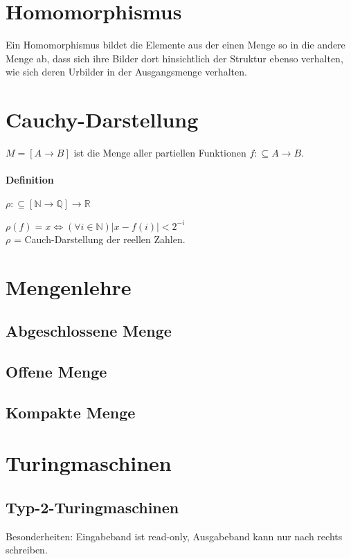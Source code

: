 \documentclass[ngerman]{scrartcl}
\begin{document}
\section{Homomorphismus}
Ein Homomorphismus bildet die Elemente aus der einen Menge so in die andere Menge ab, dass sich ihre Bilder dort hinsichtlich der Struktur ebenso verhalten, wie sich deren Urbilder in der Ausgangsmenge verhalten.


\section{Cauchy-Darstellung}
$ M = [A \rightarrow B] $ ist die Menge aller partiellen Funktionen $ f : \subseteq A \rightarrow B $.

\paragraph{Definition} $ \rho : \subseteq[\mathbb{N}\rightarrow\mathbb{Q}] \rightarrow \mathbb{R}$ 

\begin{center}
  $ \rho(f) = x \Leftrightarrow (\forall i \in \mathbb{N})|x-f(i)|< 2^{-i}$ \\
  $ \rho $ = Cauch-Darstellung der reellen Zahlen.
\end{center} 

\section{Mengenlehre}


\subsection{Abgeschlossene Menge}


\subsection{Offene Menge}

\subsection{Kompakte Menge}

\section{Turingmaschinen}

\subsection{Typ-2-Turingmaschinen}
Besonderheiten: Eingabeband ist read-only, Ausgabeband kann nur nach rechts schreiben.
\end{document}
